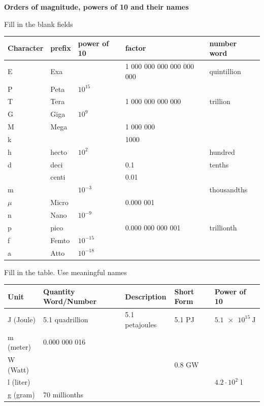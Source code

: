 \documentclass[a4paper]{article}
\begin{document}
	{\bf Orders of magnitude, powers of 10 and their names}
	\begin{enumerate}[1.]
		{\bf \item Fill in the blank fields}
		
		\renewcommand{\arraystretch}{2.2}
		\begin{tabular}{|p{2 cm}|p{2 cm}|p{2 cm}|p{4.5 cm}|p{4.5 cm}|}
			\hline
			Character & prefix & power of 10 & factor & number word\\
			\hline
			E & Exa & & 1 000 000 000 000 000 000 & quintillion\\
			\hline
			P & Peta & $10^{15}$ & &  \\
			\hline
			T & Tera & & 1 000 000 000 000 & trillion\\
			\hline
			G & Giga & $10^9$ & & \\
			\hline
			M & Mega & & 1 000 000 & \\
			\hline
			k & & & 1000 & \\
			\hline
			h & hecto & $10^2$ & & hundred \\
			\hline
			d & deci & & 0.1 & tenths \\
			\hline
			& centi & & 0.01 & \\
			\hline
			m & & $10^{-3}$ & & thousandths\\
			\hline
			$\mu$ & Micro & & 0.000 001 & \\
			\hline
			n & Nano & $10^{-9}$ & & \\
			\hline
			p & pico & & 0.000 000 000 001 & trillionth\\
			\hline
			f & Femto & $10^{-15}$& & \\
			\hline
			a & Atto & $10^{-18}$ & & \\
			\hline
		\end{tabular}
		
		{\bf \item Fill in the table. Use meaningful names }
		
		\renewcommand{\arraystretch}{2.2}
		\begin{tabular}{|p{3 cm}|p{3 cm}|p{3 cm}|p{3 cm}|p{3 cm}|}
			\hline
			Unit & Quantity Word/Number & Description & Short Form & Power of 10 \\
			\hline
			J (Joule) & 5.1 quadrillion & 5.1 petajoules & 5.1 PJ & $\SI{5.1e15}{\joule}$ \\
			\hline
			m (meter) & 0.000 000 016 & & & \\
			\hline
			W (Watt) & & & 0.8 GW & \\
			\hline
			l (liter) & & & & $4.2 \cdot 10^2 $ l \\
			\hline
			g (gram) & 70 millionths & & & \\
			\hline
		\end{tabular}
		
		
		
	\end{enumerate}
\end{document}
